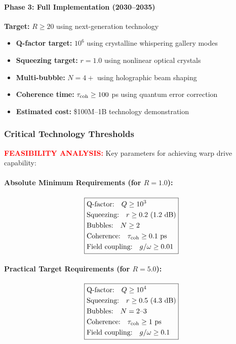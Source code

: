 \documentclass[11pt]{article}
\begin{document}
\paragraph{Phase 3: Full Implementation (2030--2035)}
\textbf{Target:} $R \geq 20$ using next-generation technology
\begin{itemize}
  \item \textbf{Q-factor target:} $10^6$ using crystalline whispering gallery modes
  \item \textbf{Squeezing target:} $r = 1.0$ using nonlinear optical crystals
  \item \textbf{Multi-bubble:} $N = 4+$ using holographic beam shaping
  \item \textbf{Coherence time:} $\tau_{\rm coh} \geq 100$ ps using quantum error correction
  \item \textbf{Estimated cost:} \$100M--1B technology demonstration
\end{itemize}

\subsubsection*{Critical Technology Thresholds}
\textcolor{red}{\textbf{FEASIBILITY ANALYSIS:}} Key parameters for achieving warp drive capability:

\paragraph{Absolute Minimum Requirements (for $R = 1.0$):}
\[
\boxed{
\begin{aligned}
&\text{Q-factor:} \quad Q \geq 10^3 \\
&\text{Squeezing:} \quad r \geq 0.2 \text{ (1.2 dB)} \\
&\text{Bubbles:} \quad N \geq 2 \\
&\text{Coherence:} \quad \tau_{\rm coh} \geq 0.1\text{ ps} \\
&\text{Field coupling:} \quad g/\omega \geq 0.01
\end{aligned}
}
\]

\paragraph{Practical Target Requirements (for $R = 5.0$):}
\begin{align*}
\boxed{
\begin{aligned}
&\text{Q-factor:} \quad Q \geq 10^4 \\
&\text{Squeezing:} \quad r \geq 0.5 \text{ (4.3 dB)} \\
&\text{Bubbles:} \quad N = 2\text{--}3 \\
&\text{Coherence:} \quad \tau_{\rm coh} \geq 1\text{ ps} \\
&\text{Field coupling:} \quad g/\omega \geq 0.1
\end{aligned}
}
\end{align*}
\end{document}
